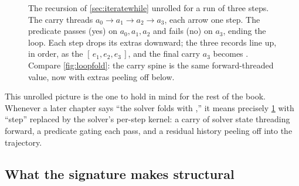 \begin{figure}[t]
\centering
{}
\caption[A fold unrolled over three steps]{The recursion of
\cref{sec:iteratewhile} unrolled for a run of three steps. The carry threads
$a_0 \to a_1 \to a_2 \to a_3$, each arrow one step. The predicate passes
(\textcolor{simGreen}{yes}) on $a_0, a_1, a_2$ and fails
(\textcolor{simRust}{no}) on $a_3$, ending the loop. Each step drops its
extras downward; the three records line up, in order, as the
 $[\,e_1, e_2, e_3\,]$, and the final carry $a_3$ becomes
. Compare \cref{fig:loopfold}: the carry spine is the same
forward-threaded value, now with extras peeling off below.}
\label{fig:unroll}
\end{figure}

This unrolled picture is the one to hold in mind for the rest of the book.
Whenever a later chapter says ``the solver folds  with
,'' it means precisely \cref{fig:unroll} with ``step''
replaced by the solver's per-step kernel: a carry of solver state threading
forward, a predicate gating each pass, and a residual history peeling off into
the trajectory.

\subsection{What the signature makes structural}
\label{sec:structural}

